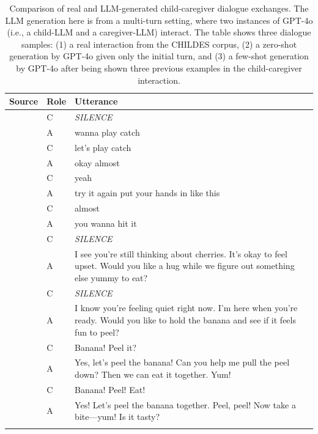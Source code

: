 \begin{table}[h]
    \small
    \centering
    \caption{Comparison of real and LLM-generated child-caregiver dialogue exchanges. The LLM generation here is from a multi-turn setting, where two instances of GPT-4o (i.e., a child-LLM and a caregiver-LLM) interact. The table shows three dialogue samples: (1) a real interaction from the CHILDES corpus, (2) a zero-shot generation by GPT-4o given only the initial turn, and (3) a few-shot generation by GPT-4o after being shown three previous examples in the child-caregiver interaction.}
    \label{tab:samples}
    \setlength{\tabcolsep}{4pt}
    \begin{tabular}{l l p{}}
    \toprule
    \textbf{Source} & \textbf{Role} & \textbf{Utterance} \\
    \midrule
    & C & \textit{SILENCE} \\
    & A & wanna play catch \\
    & C & let's play catch \\
    & A & okay almost \\
    & C & yeah \\
    & A & try it again put your hands in like this \\
    & C & almost \\
    & A & you wanna hit it \\
    \midrule
    & C & \textit{SILENCE} \\
    & A & I see you're still thinking about cherries. It's okay to feel upset. Would you like a hug while we figure out something else yummy to eat? \\
    & C & \textit{SILENCE} \\
    & A & I know you're feeling quiet right now. I'm here when you're ready. Would you like to hold the banana and see if it feels fun to peel? \\
    & C & Banana! Peel it? \\
    & A & Yes, let's peel the banana! Can you help me pull the peel down? Then we can eat it together. Yum! \\
    & C & Banana! Peel! Eat! \\
    & A & Yes! Let’s peel the banana together. Peel, peel! Now take a bite—yum! Is it tasty? \\
    \midrule

\end{tabular}
\end{table}
